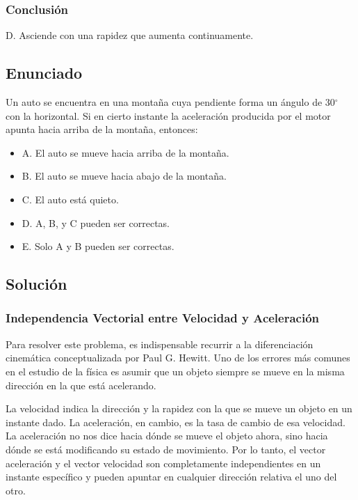 \documentclass[12pt, a4paper]{article}
\begin{document}
\subsubsection*{Conclusión}

D. Asciende con una rapidez que aumenta continuamente.


\newpage

\subsection*{Enunciado}

Un auto se encuentra en una montaña cuya pendiente forma un ángulo de 30$^\circ$ con la horizontal. Si en cierto instante la aceleración producida por el motor apunta hacia arriba de la montaña, entonces:

\begin{itemize}
    \item A. El auto se mueve hacia arriba de la montaña.
    \item B. El auto se mueve hacia abajo de la montaña.
    \item C. El auto está quieto.
    \item D. A, B, y C pueden ser correctas.
    \item E. Solo A y B pueden ser correctas.
\end{itemize}

\subsection*{Solución}

\subsubsection*{Independencia Vectorial entre Velocidad y Aceleración}

Para resolver este problema, es indispensable recurrir a la diferenciación cinemática conceptualizada por Paul G. Hewitt. Uno de los errores más comunes en el estudio de la física es asumir que un objeto siempre se mueve en la misma dirección en la que está acelerando. 

La velocidad indica la dirección y la rapidez con la que se mueve un objeto en un instante dado. La aceleración, en cambio, es la tasa de cambio de esa velocidad. La aceleración no nos dice hacia dónde se mueve el objeto ahora, sino hacia dónde se está modificando su estado de movimiento. Por lo tanto, el vector aceleración y el vector velocidad son completamente independientes en un instante específico y pueden apuntar en cualquier dirección relativa el uno del otro.
\end{document}

